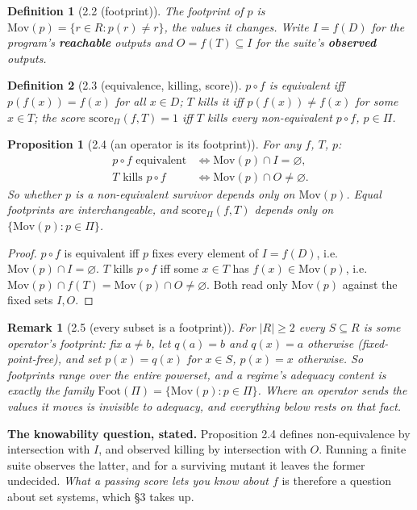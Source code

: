 \documentclass[conference]{IEEEtran}
\newcommand{\Mov}{\mathrm{Mov}}
\newcommand{\Foot}{\mathrm{Foot}}
\newcommand{\score}{\mathrm{score}}
\theoremstyle{run}
\newtheorem*{definition}{Definition}
\newtheorem*{proposition}{Proposition}
\newtheorem*{remark}{Remark}
\begin{document}
\begin{definition}[2.2 (footprint)]
The \emph{footprint} of $p$ is $\Mov(p) = \{ r \in R : p(r) \neq r \}$, the values it changes. Write $I = f(D)$ for the program's \textbf{reachable} outputs and $O = f(T) \subseteq I$ for the suite's \textbf{observed} outputs.
\end{definition}

\begin{definition}[2.3 (equivalence, killing, score)]
$p \circ f$ is \emph{equivalent} iff $p(f(x)) = f(x)$ for all $x \in D$; $T$ \emph{kills} it iff $p(f(x)) \neq f(x)$ for some $x \in T$; the score $\score_\Pi(f,T) = 1$ iff $T$ kills every non-equivalent $p \circ f$, $p \in \Pi$.
\end{definition}

\begin{proposition}[2.4 (an operator is its footprint)]
For any $f$, $T$, $p$: \[\begin{aligned} p \circ f \text{ equivalent} &\iff \Mov(p) \cap I = \varnothing,\\ T \text{ kills } p\circ f &\iff \Mov(p) \cap O \neq \varnothing. \end{aligned}\] So whether $p$ is a non-equivalent survivor depends only on $\Mov(p)$. Equal footprints are interchangeable, and $\score_\Pi(f,T)$ depends only on $\{\Mov(p) : p \in \Pi\}$.
\end{proposition}

\begin{proof}
$p\circ f$ is equivalent iff $p$ fixes every element of $I = f(D)$, i.e. $\Mov(p)\cap I = \varnothing$. $T$ kills $p\circ f$ iff some $x\in T$ has $f(x) \in \Mov(p)$, i.e. $\Mov(p)\cap f(T) = \Mov(p)\cap O \neq \varnothing$. Both read only $\Mov(p)$ against the fixed sets $I, O$.
\end{proof}

\begin{remark}[2.5 (every subset is a footprint)]
For $|R| \ge 2$ every $S \subseteq R$ is some operator's footprint: fix $a \neq b$, let $q(a) = b$ and $q(x) = a$ otherwise (fixed-point-free), and set $p(x) = q(x)$ for $x \in S$, $p(x) = x$ otherwise. So footprints range over the entire powerset, and a regime's adequacy content is exactly the family $\Foot(\Pi) = \{\Mov(p) : p \in \Pi\}$. \emph{Where} an operator sends the values it moves is invisible to adequacy, and everything below rests on that fact.
\end{remark}

\textbf{The knowability question, stated.} Proposition 2.4 defines non-equivalence by intersection with $I$, and observed killing by intersection with $O$. Running a finite suite observes the latter, and for a surviving mutant it leaves the former undecided. \emph{What a passing score lets you know about $f$} is therefore a question about set systems, which \S 3 takes up.
\end{document}
